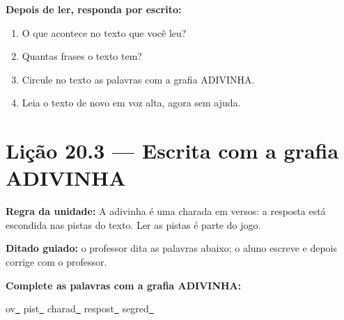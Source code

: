\textbf{Depois de ler, responda por escrito:}
\begin{enumerate}

  \item O que acontece no texto que você leu?
  \begin{center}
  \underline{\hspace{12cm}}
  \end{center}

  \item Quantas frases o texto tem?
  \begin{center}
  \underline{\hspace{12cm}}
  \end{center}

  \item Circule no texto as palavras com a grafia ADIVINHA.

  \item Leia o texto de novo em voz alta, agora sem ajuda.

\end{enumerate}

\section{Lição 20.3 --- Escrita com a grafia ADIVINHA}

\noindent\textbf{Regra da unidade:} A adivinha é uma charada em versos: a resposta está escondida nas pistas do texto. Ler as pistas é parte do jogo.


\noindent\textbf{Ditado guiado:} o professor dita as palavras abaixo; o aluno escreve e depois corrige com o professor.

\begin{center}
  \underline{\hspace{2.3cm}} \quad \underline{\hspace{2.3cm}} \quad \underline{\hspace{2.3cm}} \quad \underline{\hspace{2.3cm}}

  \underline{\hspace{2.3cm}} \quad \underline{\hspace{2.3cm}} \quad \underline{\hspace{2.3cm}} \quad \underline{\hspace{2.3cm}}
\end{center}

\noindent\textbf{Complete as palavras com a grafia ADIVINHA:}
\begin{center}
  ov\underline{~} \quad pist\underline{~} \quad charad\underline{~} \quad respost\underline{~} \quad segred\underline{~}
\end{center}

